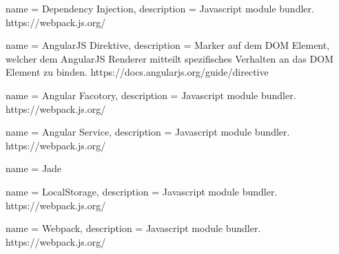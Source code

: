 {
  name = Dependency Injection,
  description = { Javascript module bundler.  https://webpack.js.org/ }
}

{
  name = AngularJS Direktive,
  description = { Marker auf dem DOM Element, welcher dem AngularJS Renderer mitteilt spezifisches Verhalten an das DOM Element zu binden. https://docs.angularjs.org/guide/directive }
}


{
  name = Angular Facotory,
  description = { Javascript module bundler.  https://webpack.js.org/ }
}


{
  name = Angular Service,
  description = { Javascript module bundler.  https://webpack.js.org/ }
}

{
  name = Jade
}

{
  name = LocalStorage,
  description = { Javascript module bundler.  https://webpack.js.org/ }
}


{
  name = Webpack,
  description = { Javascript module bundler.  https://webpack.js.org/ }
}

